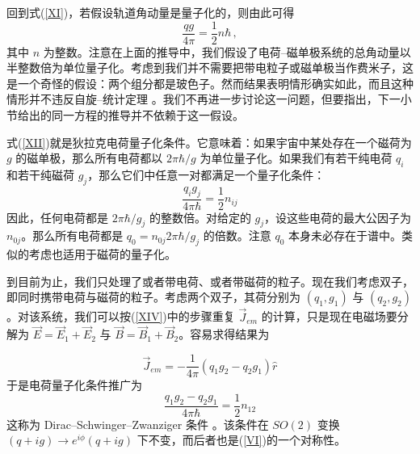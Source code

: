 回到式(\ref{XI})，若假设轨道角动量是量子化的，则由此可得
\begin{equation}
\frac{qg}{4 \pi} = \frac{1}{2} n \hbar\,,
\label{XII}
\end{equation}
其中 $n$ 为整数。注意在上面的推导中，我们假设了电荷–磁单极系统的总角动量以半整数倍为单位量子化。考虑到我们并不需要把带电粒子或磁单极当作费米子，这是一个奇怪的假设：两个组分都是玻色子。然而结果表明情形确实如此，而且这种情形并不违反自旋–统计定理
\cite{Goldhaber,Wilczek}。我们不再进一步讨论这一问题，但要指出，下一小节给出的同一方程的推导并不依赖于这一假设。


式(\ref{XII})就是狄拉克电荷量子化条件。它意味着：如果宇宙中某处存在一个磁荷为 $g$ 的磁单极，那么所有电荷都以 $2\pi\hbar/g$ 为单位量子化。如果我们有若干纯电荷 $q_i$ 和若干纯磁荷 $g_j$，那么它们中任意一对都满足一个量子化条件：
\begin{equation}
\frac{q_{i}g_{j}}{4 \pi \hbar} = \frac{1}{2} n_{ij}
\label{XIII}
\end{equation}
因此，任何电荷都是 $2\pi\hbar/g_j$ 的整数倍。对给定的 $g_j$，设这些电荷的最大公因子为 $n_{0j}$。那么所有电荷都是 $q_{0}=n_{0j}2\pi\hbar /g_{j}$ 的倍数。注意 $q_0$ 本身未必存在于谱中。类似的考虑也适用于磁荷的量子化。

到目前为止，我们只处理了或者带电荷、或者带磁荷的粒子。现在我们考虑双子，即同时携带电荷与磁荷的粒子。考虑两个双子，其荷分别为 $(q_1,g_1)$ 与 $(q_2,g_2)$。对该系统，我们可以按(\ref{XIV})中的步骤重复 $\vec{J}_{em}$ 的计算，只是现在电磁场要分解为 $\vec{E}=\vec{E}_1+\vec{E}_2$ 与 $\vec{B}=\vec{B}_1+ \vec{B}_2$。容易求得结果为

\begin{equation}
\vec{J}_{em}=-\frac{1}{4\pi}\left(q_1 g_2 - q_2 g_1\right)\hat{r} 
\label{Jemd}
\end{equation}
于是电荷量子化条件推广为
\begin{equation}
\frac{q_1 g_2 - q_2 g_1}{4\pi\hbar}=\frac{1}{2} n_{12}
\label{DSZ}
\end{equation}
这称为 Dirac–Schwinger–Zwanziger 条件
\cite{Schwinger,Zwanziger}。该条件在 $SO(2)$ 变换 $(q+ig)\rightarrow e^{i\phi}(q+ig)$ 下不变，而后者也是(\ref{VI})的一个对称性。

